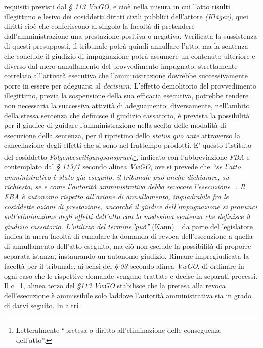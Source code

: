 \documentclass[12pt,it,a4paper,]{report}
\begin{document}
requisiti previsti dal \emph{§ 113 VwGO}, e cioè nella misura in cui
l'atto risulti illegittimo e lesivo dei cosiddetti diritti civili
pubblici dell'attore \emph{(Kläger)}, quei diritti cioè che conferiscono
al singolo la facoltà di pretendere dall'amministrazione una prestazione
positiva o negativa. Verificata la sussistenza di questi presupposti, il
tribunale potrà quindi annullare l'atto, ma la sentenza che conclude il
giudizio di impugnazione potrà assumere un contenuto ulteriore e diverso
dal mero annullamento del provvedimento impugnato, strettamente
correlato all'attività esecutiva che l'amministrazione dovrebbe
successivamente porre in essere per adeguarsi al \emph{decisium}.
L'effetto demolitorio del provvedimento illegittimo, previa la
sospensione della sua efficacia esecutiva, potrebbe rendere non
necessaria la successiva attività di adeguamento; diversamente,
nell'ambito della stessa sentenza che definisce il giudizio cassatorio,
è prevista la possibilità per il giudice di guidare l'amministrazione
nella scelta delle modalità di esecuzione della sentenza, per il
ripristino dello \emph{status quo ante} attraverso la cancellazione
degli effetti che si sono nel frattempo prodotti. E' questo l'istituto
del cosiddetto \emph{Folgenbeseitigungsanspruch}\footnote{Letteralmente
  ``pretesa o diritto all'eliminazione delle conseguenze dell'atto''.},
indicato con l'abbreviazione \emph{FBA} e contemplato dal \emph{§ 113/1}
secondo alinea \emph{VwGO}, ove si prevede che \emph{``se l'atto
amministrativo è stato già eseguito, il tribunale può anche dichiarare,
su richiesta, se e come l'autorità amministrativa debba revocare
l'esecuzione\_. Il \emph{FBA} è autonomo rispetto all'azione di
annullamento, inquadrabile fra le cosiddette azioni di prestazione,
ancorché il giudice dell'impugnazione si pronunci sull'eliminazione
degli effetti dell'atto con la medesima sentenza che definisce il
giudizio cassatorio. L'utilizzo del termine''può'' }(Kann)\_ da parte
del legislatore indica la mera facoltà di cumulare la domanda di revoca
dell'esecuzione a quella di annullamento dell'atto eseguito, ma ciò non
esclude la possibilità di proporre separata istanza, instaurando un
autonomo giudizio. Rimane impregiudicata la facoltà per il tribunale, ai
sensi del \emph{§ 93} secondo alinea \emph{VwGO}, di ordinare in ogni
caso che le rispettive domande vengano trattate e decise in separati
processi. Il c.~1, alinea terzo del \emph{§113 VwGO} stabilisce che la
pretesa alla revoca dell'esecuzione è ammissibile solo laddove
l'autorità amministrativa sia in grado di darvi seguito. In altri
\end{document}
